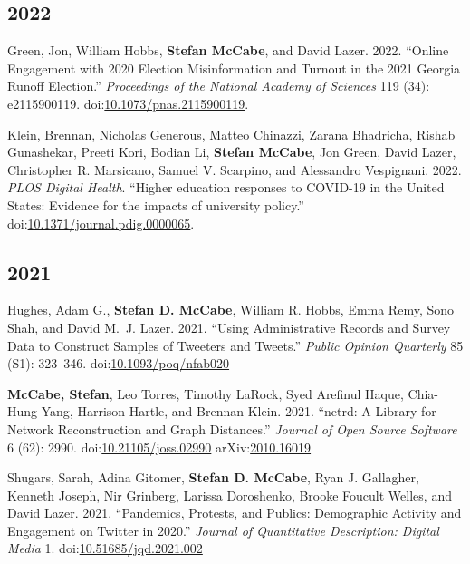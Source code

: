 \documentclass[11pt, letter]{article}
\begin{document}
\subsection{2022}
\begin{hangparas}{.25in}{1}
Green, Jon, William Hobbs, \textbf{Stefan McCabe}, and David
Lazer. 2022. “Online Engagement with 2020 Election Misinformation and
Turnout in the 2021 Georgia Runoff Election.” \textit{Proceedings of the
National Academy of Sciences} 119 (34):
e2115900119. doi:\href{https://doi.org/10.1073/pnas.2115900119}{10.1073/pnas.2115900119}.\vspace{2mm}


Klein, Brennan, Nicholas Generous, Matteo Chinazzi, Zarana Bhadricha,
Rishab Gunashekar, Preeti Kori, Bodian Li, \textbf{Stefan McCabe}, Jon
Green, David Lazer, Christopher R. Marsicano, Samuel V. Scarpino, and
Alessandro Vespignani. 2022. \textit{PLOS Digital Health}. ``Higher
education responses to COVID-19 in the United States: Evidence for the
impacts of university policy.''
doi:\href{https://doi.org/10.1371/journal.pdig.0000065}{10.1371/journal.pdig.0000065}.\vspace{2mm}
\end{hangparas}


\subsection{2021}
\begin{hangparas}{.25in}{1}
Hughes, Adam G.,\textsuperscript{\textdagger} \textbf{Stefan D.
McCabe},\textsuperscript{\textdagger} William R. Hobbs, Emma Remy, Sono
Shah, and David M.~J. Lazer. 2021. ``Using Administrative Records and
Survey Data to Construct Samples of Tweeters and Tweets.'' \textit{Public
Opinion Quarterly} 85 (S1): 323--346.
doi:\href{https://doi.org/10.1093/poq/nfab020}{10.1093/poq/nfab020}
\vspace{-1mm}

\textbf{McCabe, Stefan}, Leo Torres, Timothy LaRock, Syed Arefinul Haque,
Chia-Hung Yang, Harrison Hartle, and Brennan Klein. 2021.
``netrd: A Library for Network Reconstruction and Graph Distances.''
\textit{Journal of Open Source Software} 6 (62): 2990.
doi:\href{https://doi.org/10.21105/joss.02990}{10.21105/joss.02990}
arXiv:\href{https://arxiv.org/abs/2010.16019}{2010.16019} \vspace{-1mm}

Shugars, Sarah, Adina Gitomer, \textbf{Stefan D. McCabe}, Ryan J. Gallagher,
Kenneth Joseph, Nir Grinberg, Larissa Doroshenko, Brooke Foucult Welles, and
David Lazer. 2021. ``Pandemics, Protests, and Publics: Demographic Activity and
Engagement on Twitter in 2020.'' \textit{Journal of Quantitative Description:
  Digital Media} 1.
doi:\href{https://doi.org/10.51685/jqd.2021.002}{10.51685/jqd.2021.002} \vspace{2mm}
\end{hangparas}
\end{document}
